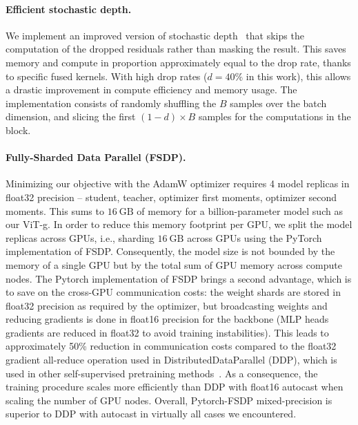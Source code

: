 \paragraph{Efficient stochastic depth.} We implement an improved version of stochastic depth~\citep{huang2016deep} that skips the computation of the dropped residuals rather than masking the result. This saves memory and compute in proportion approximately equal to the drop rate, thanks to specific fused kernels. With high drop rates ($d = 40\%$ in this work), this allows a drastic improvement in compute efficiency and memory usage. The implementation consists of randomly shuffling the $B$ samples over the batch dimension, and slicing the first $(1-d) \times B$ samples for the computations in the block. 

\paragraph{Fully-Sharded Data Parallel (FSDP).} Minimizing our objective with the AdamW optimizer requires 4 model replicas in float32 precision  -- student, teacher, optimizer first moments, optimizer second moments. This sums to $16~\mathrm{GB}$ of memory for a billion-parameter model such as our ViT-g. In order to reduce this memory footprint per GPU, we split the model replicas across GPUs, i.e., sharding $16~\mathrm{GB}$ across GPUs using the PyTorch implementation of FSDP. Consequently, the model size is not bounded by the memory of a single GPU but by the total sum of GPU memory across compute nodes. The Pytorch implementation of FSDP brings a second advantage, which is to save on the cross-GPU communication costs: the weight shards are stored in float32 precision as required by the optimizer, but broadcasting weights and reducing gradients is done in float16 precision for the backbone (MLP heads gradients are reduced in float32 to avoid training instabilities). This leads to approximately 50\% reduction in communication costs compared to the float32 gradient all-reduce operation used in DistributedDataParallel (DDP), which is used in other self-supervised pretraining methods~\citep{caron2021emerging,zhou2021ibot}. As a consequence, the training procedure scales more efficiently than DDP with float16 autocast when scaling the number of GPU nodes. Overall, Pytorch-FSDP mixed-precision is superior to DDP with autocast in virtually all cases we encountered. 


